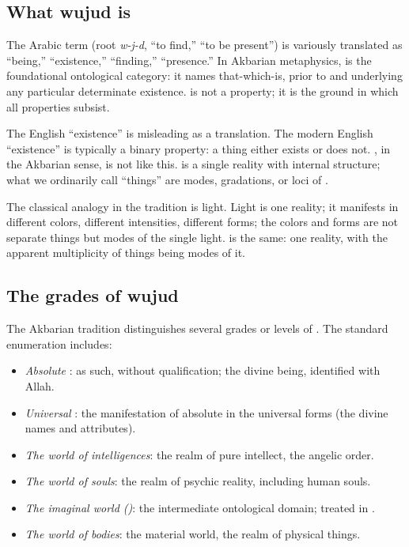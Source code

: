 \subsection{What wujud is}

\begin{definition}
\label{def:wujud}
The Arabic term  (root \textit{w-j-d}, ``to find,''
``to be present'') is variously translated as ``being,''
``existence,'' ``finding,'' ``presence.'' In Akbarian metaphysics,
 is the foundational ontological category: it names
that-which-is, prior to and underlying any particular determinate
existence.  is not a property; it is the ground in which
all properties subsist.
\end{definition}

The English ``existence'' is misleading as a translation. The
modern English ``existence'' is typically a binary property: a
thing either exists or does not. , in the Akbarian
sense, is not like this.  is a single reality with
internal structure; what we ordinarily call ``things'' are modes,
gradations, or loci of .

The classical analogy in the tradition is light. Light is one
reality; it manifests in different colors, different intensities,
different forms; the colors and forms are not separate things but
modes of the single light.  is the same: one reality, with
the apparent multiplicity of things being modes of it.

\subsection{The grades of wujud}

The Akbarian tradition distinguishes several grades or levels of
. The standard enumeration includes:

\begin{itemize}[leftmargin=2em]
    \item \emph{Absolute }:  as such, without
    qualification; the divine being, identified with Allah.
    \item \emph{Universal }: the manifestation of
    absolute  in the universal forms (the divine names
    and attributes).
    \item \emph{The world of intelligences}: the realm of pure
    intellect, the angelic order.
    \item \emph{The world of souls}: the realm of psychic reality,
    including human souls.
    \item \emph{The imaginal world ()}: the
    intermediate ontological domain; treated in .
    \item \emph{The world of bodies}: the material world, the realm
    of physical things.
\end{itemize}

